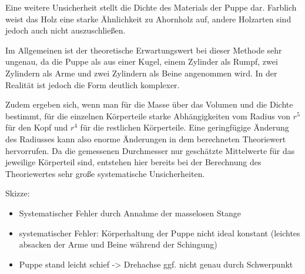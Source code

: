 Eine weitere Unsicherheit stellt die Dichte des Materials der Puppe dar. Farblich
weist das Holz eine starke Ähnlichkeit zu Ahornholz auf, andere Holzarten sind jedoch
auch nicht auszuschließen.

Im Allgemeinen ist der theoretische Erwartungswert bei dieser Methode sehr ungenau,
da die Puppe als aus einer Kugel, einem Zylinder als Rumpf, zwei Zylindern als Arme
und zwei Zylindern als Beine angenommen wird. In der Realität ist jedoch die Form deutlich
komplexer.

Zudem ergeben sich, wenn man für die Masse über das Volumen und die Dichte bestimmt,
für die einzelnen Körperteile starke Abhängigkeiten vom Radius von $r^5$ für den Kopf
und $r^4$ für die restlichen Körperteile. Eine geringfügige Änderung des Radiusses
kann also enorme Änderungen in dem berechneten Theoriewert hervorrufen. Da die gemessenen
Durchmesser nur geschätzte Mittelwerte für das jeweilige Körperteil sind, entstehen
hier bereits bei der Berechnung des Theoriewertes sehr große systematische Unsicherheiten.





Skizze:
\begin{itemize}
  \item Systematischer Fehler durch Annahme der masselosen Stange
  \item systematischer Fehler: Körperhaltung der Puppe nicht ideal konstant (leichtes
  absacken der Arme und Beine während der Schingung)
  \item Puppe stand leicht schief -> Drehachse ggf. nicht genau durch Schwerpunkt

\end{itemize}

